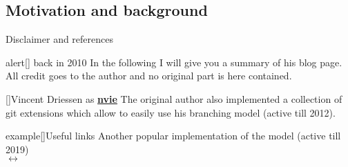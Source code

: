 \documentclass[usenames,svgnames,14pt]{beamer}
\begin{document}
\subsection{Motivation and background}
\begin{frame}{Disclaimer and references}
    \PrepareURLsymbol[PT]
    \vspace{-3mm}
    \begin{varblock}{alert}[\textwidth]{ back in 2010}
        In the following I will give you a summary of his blog page.\\
        All credit goes to the author and no original part is here contained.
    \end{varblock}
    \vspace{-1mm}
    \begin{varblock}{}[\textwidth]{Vincent Driessen as \;\href{https://github.com/nvie/gitflow}{\faGithub\;\textbf{nvie}}}
        The original author also implemented a collection of git extensions which allow to easily use his branching model (active till 2012).
    \end{varblock}
    \vspace{-1mm}
    \PrepareURLsymbol[PS]
    \begin{varblock}{example}[\textwidth]{Useful links}
        Another popular implementation of the model (active till 2019)\\
        \;$\longleftrightarrow$\;
    \end{varblock}
\end{frame}
\end{document}

